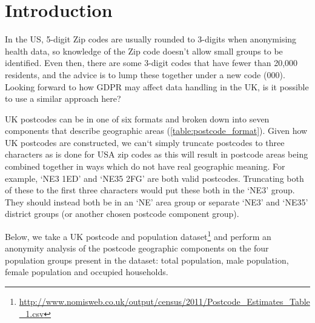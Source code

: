 \documentclass[12pt, a4paper]{article}
\title{\mytitle}
\author{\myauthor}
\date{\mydate}
\begin{document}
\maketitle

\section{Introduction}

In the US, 5-digit Zip codes are usually rounded to 3-digits when anonymising health data, so knowledge of the Zip code doesn’t allow small groups to be identified.  Even then, there are some 3-digit codes that have fewer than 20,000 residents, and the advice is to lump these together under a new code (000). Looking forward to how GDPR may affect data handling in the UK, is it possible to use a similar approach here?

UK postcodes can be in one of six formats and broken down into seven components that describe geographic areas (\cref{table:postcode_format}). Given how UK postcodes are constructed, we can`t simply truncate postcodes to three characters as is done for USA zip codes as this will result in postcode areas being combined together in ways which do not have real geographic meaning. For example, `NE3 1ED' and `NE35 2FG' are both valid postcodes. Truncating both of these to the first three characters would put these both in the `NE3' group. They should instead both be in an `NE' area group or separate `NE3' and `NE35' district groups (or another chosen postcode component group).

Below, we take a UK postcode and population dataset\footnote{\url{http://www.nomisweb.co.uk/output/census/2011/Postcode_Estimates_Table_1.csv}} and perform an anonymity analysis of the postcode geographic components on the four population groups present in the dataset: total population, male population, female population and occupied households.
\end{document}
